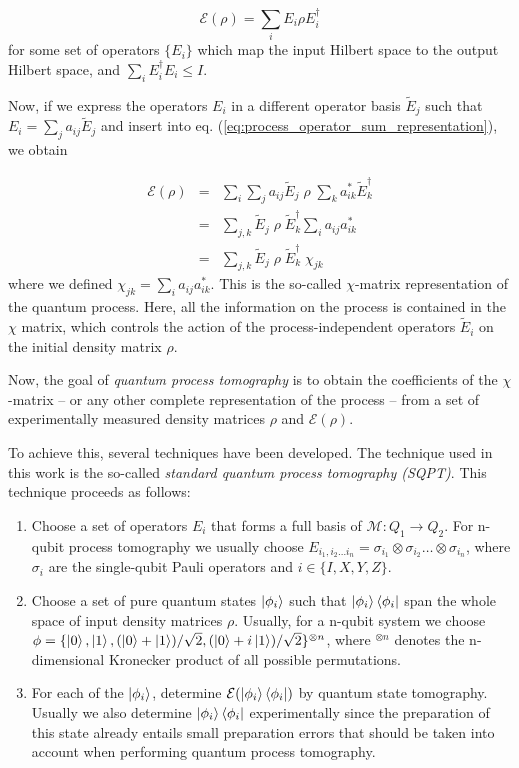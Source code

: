 \begin{equation}
  \mathcal{E}(\rho) = \sum\limits_i E_i \rho E_i^\dagger \label{eq:process_operator_sum_representation}
\end{equation}
for some set of operators $\{ E_i \}$ which map the input Hilbert space to the output Hilbert space, and $\sum_i E_i^\dagger E_i \le I$.

Now, if we express the operators $E_i$ in a different operator basis $\tilde{E}_j$ such that $E_i = \sum_j a_{ij} \tilde{E}_{j}$ and insert into eq. (\ref{eq:process_operator_sum_representation}), we obtain

\begin{eqnarray}
 \mathcal{E}(\rho) & = & \sum\limits_i \sum\limits_j a_{ij} \tilde{E}_j \;\rho\; \sum\limits_k a_{ik}^* \tilde{E}_k^\dagger \\
& = & \sum\limits_{j,k}\tilde{E}_j \; \rho \; \tilde{E}_k^\dagger \sum\limits_i a_{ij} a_{ik}^* \\
& = & \sum\limits_{j,k}\tilde{E}_j \; \rho \; \tilde{E}_k^\dagger \; \chi_{jk} \label{eq:process_chi_representation}
\end{eqnarray}
where we defined $\chi_{jk} = \sum\limits_i a_{ij} a_{ik}^*$. This is the so-called $\chi$-matrix representation of the quantum process. Here, all the information on the process is contained in the $\chi$ matrix, which controls the action of the process-independent operators $\tilde{E}_i$ on the initial density matrix $\rho$.

Now, the goal of {\it quantum process tomography} is to obtain the coefficients of the $\chi$-matrix -- or any other complete representation of the process -- from a set of experimentally measured density matrices $\rho$ and $\mathcal{E}(\rho)$.

To achieve this, several techniques have been developed. The technique used in this work is the so-called {\it standard quantum process tomography (SQPT)}. This technique proceeds as follows:

\begin{enumerate}
\item Choose a set of operators $E_i$ that forms a full basis of $\mathcal{M}: Q_1 \to Q_2$. For n-qubit process tomography we usually choose $E_{i_1,i_2 \hdots i_n} = \sigma_{i_1}\otimes \sigma_{i_2}\hdots\otimes\sigma_{i_n}$, where $\sigma_i$ are the single-qubit Pauli operators and $i\in\{I,X,Y,Z\}$. 
\item Choose a set of pure quantum states $\left| \phi_i \right>$ such that $\left| \phi_i \right>\left< \phi_i \right|$ span the whole space of input density matrices $\rho$. Usually, for a n-qubit system we choose $\phi = \{\left| 0 \right>,\left| 1 \right>,(\left| 0 \right>+\left| 1 \right>)/\sqrt{2},(\left| 0 \right>+i\left| 1 \right>)/\sqrt{2}\}^{\otimes n}$, where $^{\otimes n}$ denotes the n-dimensional Kronecker product of all possible permutations.
\item For each of the $\left| \phi_i \right>$, determine $\mathcal{E}(\left| \phi_i \right>\left< \phi_i \right|)$ by quantum state tomography. Usually we also determine $\left| \phi_i \right>\left< \phi_i \right|$ experimentally since the preparation of this state already entails small preparation errors that should be taken into account when performing quantum process tomography. 
\end{enumerate}

